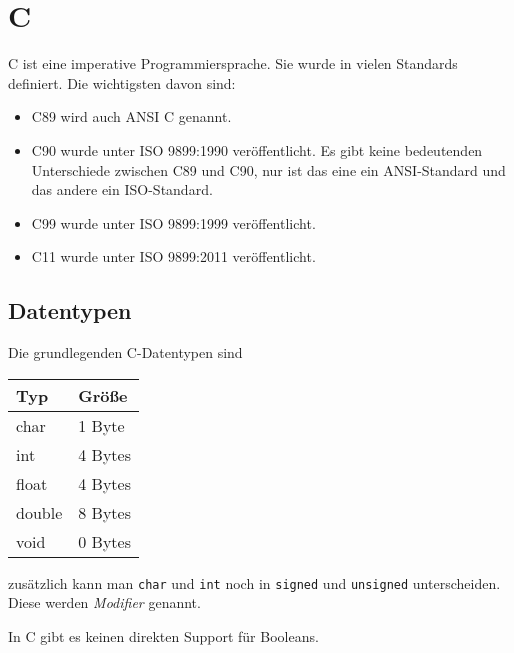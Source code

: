 \chapter{C}
C ist eine imperative Programmiersprache. Sie wurde in vielen Standards
definiert. Die wichtigsten davon sind:

\begin{itemize}
    \item C89 wird auch ANSI C genannt.
    \item C90 wurde unter ISO 9899:1990 veröffentlicht. Es gibt keine bedeutenden
          Unterschiede zwischen C89 und C90, nur ist das eine ein ANSI-Standard
          und das andere ein ISO-Standard.
    \item C99 wurde unter ISO 9899:1999 veröffentlicht.
    \item C11 wurde unter ISO 9899:2011 veröffentlicht.
\end{itemize}

\section{Datentypen}
Die grundlegenden C-Datentypen sind
\begin{table}[htp]
    \centering
    \begin{tabular}{|l|l|}
    \hline
    \textbf{Typ}    & \textbf{Größe}   \\ \hline\hline
    char   & 1 Byte  \\ \hline
    int    & 4 Bytes \\ \hline
    float  & 4 Bytes \\ \hline
    double & 8 Bytes \\ \hline
    void   & 0 Bytes \\ \hline
    \end{tabular}
\end{table}

zusätzlich kann man \texttt{char} und \texttt{int}
noch in \texttt{signed} und \texttt{unsigned}
unterscheiden. Diese werden \textit{Modifier} genannt.

In C gibt es keinen direkten Support für Booleans.

